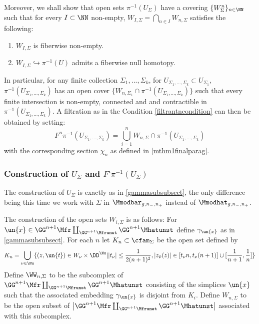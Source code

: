 \documentclass[a4paper,10pt]{amsart}
\begin{document}
Moreover, we shall show that open sets $\pi^{-1}(U_{\Sigma})$ have a covering $\{W^{n}_{\Sigma}\}_{n \in \NN}$ such that for every $I \subset \NN$ non-empty, $W_{I,\Sigma} = \bigcap_{n \in I} W_{n,\Sigma}$ satisfies the following:
\begin{enumerate}\label{Wsigmacond_red}
	\item $W_{I,\Sigma}$ is fiberwise non-empty. 
	\item $W_{I,\Sigma} \hookrightarrow \pi^{-1}(U)$ admits a fiberwise null homotopy. 
\end{enumerate}
In particular, for any finite collection $\Sigma_1,...,\Sigma_k$, for $U_{\Sigma_1,...,\Sigma_k} \subset U_{\Sigma_1}$,  $\pi^{-1}(U_{\Sigma_1,...,\Sigma_k})$ has an open cover $\{W_{n,\Sigma_1} \cap \pi^{-1}(U_{\Sigma_1,...,\Sigma_k})\}$ such that every finite intersection is non-empty, connected and and contractible in $\pi^{-1}(U_{\Sigma_1,...,\Sigma_k})$. A filtration as in the Condition \ref{filtrantncondition} can then be obtained by setting: 
\[F^n \pi^{-1}(U_{\Sigma_1,...,\Sigma_k}) = \bigcup_{i=1}^n W_{n,\Sigma} \cap \pi^{-1}(U_{\Sigma_1,...,\Sigma_k})\]
with the corresponding section $\chi_n$ as defined in \ref{mthm1finalparag}.	

\subsubsection{Construction of $U_{\Sigma}$ and $F^i \pi^{-1}(U_{\Sigma})$}\label{gammasubsubsect_red}
The construction of $U_{\Sigma}$ is exactly as in \ref{gammasubsubsect}, the only difference being this time we work with $\Sigma$ in $\Mmodbar_{g,n_-,n_+}$ instead of $\Mmodhat_{g,n_-,n_+}$.

The construction of the open sets $W_{i,\Sigma}$ is as follows:
For $\un{x} \in \GG^{n+1} \Mfr \coprod_{\GG^{n+1}  \Mfrunst} \GG^{n+1} \Mhatunst $ define $\gamma_{\un{x}}$ as in \ref{gammasubsubsect}. For each $n$ let $K_n \subset \cfam_{\Sigma}$ be the open set defined by 
\[ K_n = \bigcup_{\nu \in \Nu} \{ (z, \un{t}) \in W_{\nu} \times \DD^{\Nu} | |t_\nu| \leq \frac{1}{2(n+1)^2}, |z_{\hat{\nu}}(z) | \in [ t_{\nu} n, t_{\nu} (n+1) ] \cup [\frac{1}{n+1}, \frac{1}{n}] \} \]
Define $\WW_{n,\Sigma}$ to be the subcomplex of $\GG^{n+1} \Mfr \coprod_{\GG^{n+1}  \Mfrunst} \GG^{n+1} \Mhatunst$ consisting of the simplices $\un{x}$ such that the associated embedding $\gamma_{\un{x}}$ is disjoint from $K_i$. Define $W_{n,\Sigma}$ to be the open subset of $\left| \GG^{n+1} \Mfr \coprod_{\GG^{n+1}  \Mfrunst} \GG^{n+1} \Mhatunst \right|$ associated with this subcomplex.
\end{document}
